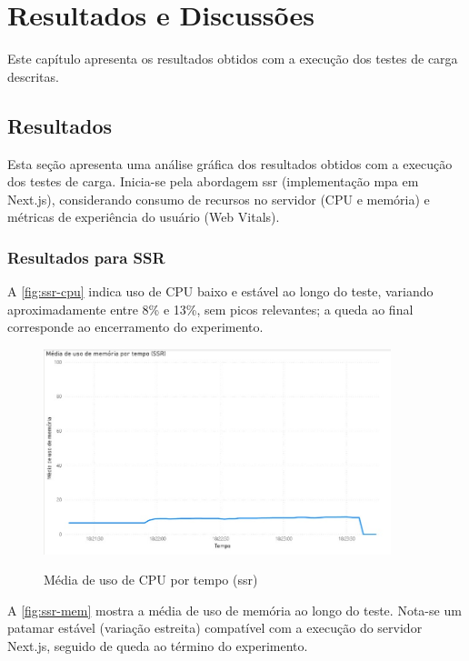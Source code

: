 \chapter{Resultados e Discussões}
\label{cap:resultados}
Este capítulo apresenta os resultados obtidos com a execução dos testes de carga descritas.

\section{Resultados}
Esta seção apresenta uma análise gráfica dos resultados obtidos com a execução dos testes de carga. Inicia-se pela abordagem \acrshort{ssr} (implementação \acrshort{mpa} em Next.js), considerando consumo de recursos no servidor (CPU e memória) e métricas de experiência do usuário (Web Vitals).

\subsection{Resultados para SSR}
\label{subsec:resultados-ssr}

A \autoref{fig:ssr-cpu} indica uso de CPU baixo e estável ao longo do teste, variando aproximadamente entre 8\% e 13\%, sem picos relevantes; a queda ao final corresponde ao encerramento do experimento.

\begin{figure}[H]
  \centering
  \caption{Média de uso de CPU por tempo (\acrshort{ssr})}
  \includegraphics[width=0.9\textwidth]{media/uso_cpu_ssr.jpeg}
  \label{fig:ssr-cpu}
\end{figure}

A \autoref{fig:ssr-mem} mostra a média de uso de memória ao longo do teste. Nota-se um patamar estável (variação estreita) compatível com a execução do servidor Next.js, seguido de queda ao término do experimento.

